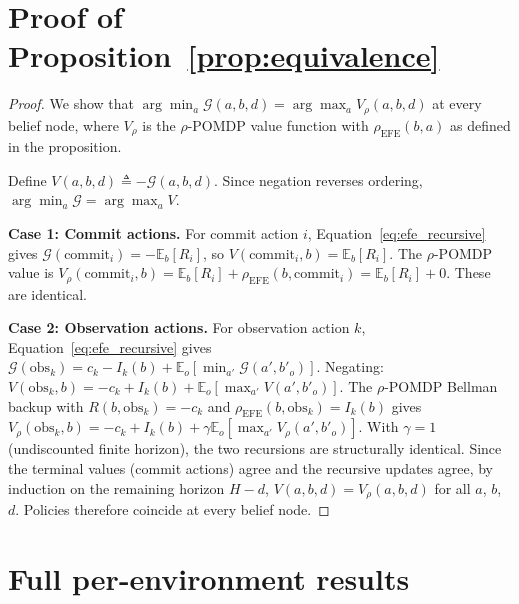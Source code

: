 \documentclass[runningheads]{llncs}
\begin{document}
\appendix

\section{Proof of Proposition~\ref{prop:equivalence}}
\label{app:proof}

\begin{proof}
We show that $\arg\min_a \mathcal{G}(a, b, d) = \arg\max_a V_\rho(a, b, d)$ at every belief node, where $V_\rho$ is the $\rho$-POMDP value function with $\rho_{\mathrm{EFE}}(b, a)$ as defined in the proposition.

Define $V(a, b, d) \triangleq -\mathcal{G}(a, b, d)$. Since negation reverses ordering, $\arg\min_a \mathcal{G} = \arg\max_a V$.

\textbf{Case 1: Commit actions.} For commit action $i$, Equation~\ref{eq:efe_recursive} gives $\mathcal{G}(\text{commit}_i) = -\mathbb{E}_b[R_i]$, so $V(\text{commit}_i, b) = \mathbb{E}_b[R_i]$. The $\rho$-POMDP value is $V_\rho(\text{commit}_i, b) = \mathbb{E}_b[R_i] + \rho_{\mathrm{EFE}}(b, \text{commit}_i) = \mathbb{E}_b[R_i] + 0$. These are identical.

\textbf{Case 2: Observation actions.} For observation action $k$, Equation~\ref{eq:efe_recursive} gives
$\mathcal{G}(\text{obs}_k) = c_k - I_k(b) + \mathbb{E}_o[\min_{a'} \mathcal{G}(a', b'_o)].$
Negating:
$V(\text{obs}_k, b) = -c_k + I_k(b) + \mathbb{E}_o[\max_{a'} V(a', b'_o)].$
The $\rho$-POMDP Bellman backup with $R(b, \text{obs}_k) = -c_k$ and $\rho_{\mathrm{EFE}}(b, \text{obs}_k) = I_k(b)$ gives
$V_\rho(\text{obs}_k, b) = -c_k + I_k(b) + \gamma \mathbb{E}_o[\max_{a'} V_\rho(a', b'_o)].$
With $\gamma = 1$ (undiscounted finite horizon), the two recursions are structurally identical. Since the terminal values (commit actions) agree and the recursive updates agree, by induction on the remaining horizon $H - d$, $V(a, b, d) = V_\rho(a, b, d)$ for all $a$, $b$, $d$. Policies therefore coincide at every belief node.
\end{proof}

\section{Full per-environment results}
\label{app:full_tables}
\end{document}
